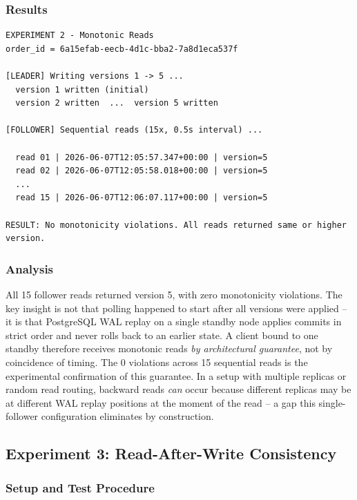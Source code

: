 \documentclass[12pt,a4paper]{article}
\begin{document}
\subsubsection{Results}

\begin{lstlisting}[style=outputstyle, caption={Experiment 2 output}]
EXPERIMENT 2 - Monotonic Reads
order_id = 6a15efab-eecb-4d1c-bba2-7a8d1eca537f

[LEADER] Writing versions 1 -> 5 ...
  version 1 written (initial)
  version 2 written  ...  version 5 written

[FOLLOWER] Sequential reads (15x, 0.5s interval) ...

  read 01 | 2026-06-07T12:05:57.347+00:00 | version=5
  read 02 | 2026-06-07T12:05:58.018+00:00 | version=5
  ...
  read 15 | 2026-06-07T12:06:07.117+00:00 | version=5

RESULT: No monotonicity violations. All reads returned same or higher version.
\end{lstlisting}

\subsubsection{Analysis}

All 15 follower reads returned version 5, with zero monotonicity violations.
The key insight is not that polling happened to start after all versions were
applied -- it is that PostgreSQL WAL replay on a single standby node applies
commits in strict order and never rolls back to an earlier state. A client
bound to one standby therefore receives monotonic reads \textit{by architectural
guarantee}, not by coincidence of timing. The 0 violations across 15 sequential
reads is the experimental confirmation of this guarantee. In a setup with
multiple replicas or random read routing, backward reads \textit{can} occur
because different replicas may be at different WAL replay positions at the
moment of the read -- a gap this single-follower configuration eliminates
by construction.

\subsection{Experiment 3: Read-After-Write Consistency}

\subsubsection{Setup and Test Procedure}
\end{document}

